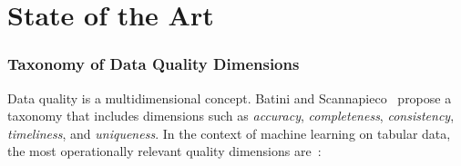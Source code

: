 \chapter{State of the Art}
\label{chap:state-of-the-art}




\subsection{Taxonomy of Data Quality Dimensions}
\label{sec:dq-taxonomy}

Data quality is a multidimensional concept.  Batini and
Scannapieco~\cite{batini2016data} propose a taxonomy that includes dimensions
such as \emph{accuracy}, \emph{completeness}, \emph{consistency},
\emph{timeliness}, and \emph{uniqueness}.  In the context of machine learning
on tabular data, the most operationally relevant quality dimensions
are~\cite{budach2022effects, gupta2021data}:

